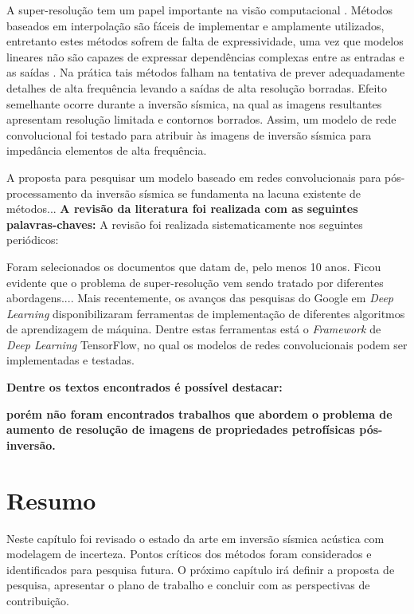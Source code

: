 A super-resolução tem um papel importante na visão computacional \cite{DongLoy2016}.
Métodos baseados em interpolação são fáceis de implementar e amplamente utilizados,
entretanto estes métodos sofrem de falta de expressividade, uma vez que modelos lineares
não são capazes de expressar dependências complexas entre as entradas e as saídas \cite{HsiehAndrews1978}.
Na prática tais métodos falham na tentativa de prever adequadamente detalhes de alta frequência
levando a saídas de alta resolução borradas. Efeito semelhante ocorre durante a inversão sísmica,
na qual as imagens resultantes apresentam resolução limitada e contornos borrados. Assim, um modelo
de rede convolucional foi testado para atribuir às imagens de inversão sísmica para impedância
elementos de alta frequência.

A proposta para pesquisar um modelo baseado em redes convolucionais para pós-processamento
da inversão sísmica se fundamenta na lacuna existente de métodos...
\textbf{A revisão da literatura foi realizada com as seguintes palavras-chaves:}
A revisão foi realizada sistematicamente nos seguintes periódicos:

Foram selecionados os documentos que datam de, pelo menos 10 anos. Ficou evidente que o problema
de super-resolução vem sendo tratado por diferentes abordagens....
Mais recentemente, os avanços das pesquisas do Google em \textit{Deep Learning} disponibilizaram
ferramentas de implementação de diferentes algoritmos de aprendizagem de máquina. Dentre estas
ferramentas está o \textit{Framework} de \textit{Deep Learning} TensorFlow, no qual os modelos
de redes convolucionais podem ser implementadas e testadas.

\textbf{Dentre os textos encontrados é possível destacar:}

\textbf{porém não foram encontrados trabalhos que abordem o problema de aumento de resolução de imagens de propriedades petrofísicas
pós-inversão.}

\section{Resumo}

Neste capítulo foi revisado o estado da arte em inversão sísmica acústica
com modelagem de incerteza. Pontos críticos dos métodos foram considerados e
identificados para pesquisa futura. O próximo capítulo irá definir a proposta de
pesquisa, apresentar o plano de trabalho e concluir com as perspectivas de
contribuição.
